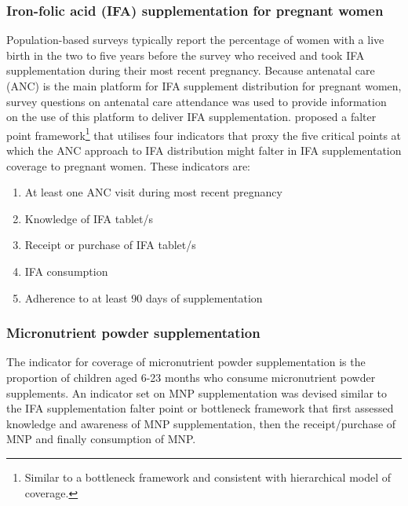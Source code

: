 \documentclass[12pt,a4paper]{article}
\let\rmarkdownfootnote\footnote%
\def\footnote{\protect\rmarkdownfootnote}
\begin{document}
\hypertarget{iron-folic-acid-ifa-supplementation-for-pregnant-women}{%
\subsubsection{Iron-folic acid (IFA) supplementation for pregnant women}\label{iron-folic-acid-ifa-supplementation-for-pregnant-women}}

Population-based surveys typically report the percentage of women with a live birth in the two to five years before the survey who received and took IFA supplementation during their most recent pregnancy. Because antenatal care (ANC) is the main platform for IFA supplement distribution for pregnant women, survey questions on antenatal care attendance was used to provide information on the use of this platform to deliver IFA supplementation. \citet{Sununtnasuk:2015kb} proposed a falter point framework\footnote{Similar to a bottleneck framework and consistent with \citet{Tanahashi:1978we} hierarchical model of coverage.} that utilises four indicators that proxy the five critical points at which the ANC approach to IFA distribution might falter in IFA supplementation coverage to pregnant women. These indicators are:

\begin{enumerate}
\def\labelenumi{\arabic{enumi}.}
\item
  At least one ANC visit during most recent pregnancy
\item
  Knowledge of IFA tablet/s
\item
  Receipt or purchase of IFA tablet/s
\item
  IFA consumption
\item
  Adherence to at least 90 days of supplementation
\end{enumerate}

\hypertarget{micronutrient-powder-supplementation}{%
\subsubsection{Micronutrient powder supplementation}\label{micronutrient-powder-supplementation}}

The indicator for coverage of micronutrient powder supplementation is the proportion of children aged 6-23 months who consume micronutrient powder supplements. An indicator set on MNP supplementation was devised similar to the IFA supplementation falter point or bottleneck framework that first assessed knowledge and awareness of MNP supplementation, then the receipt/purchase of MNP and finally consumption of MNP.
\end{document}
